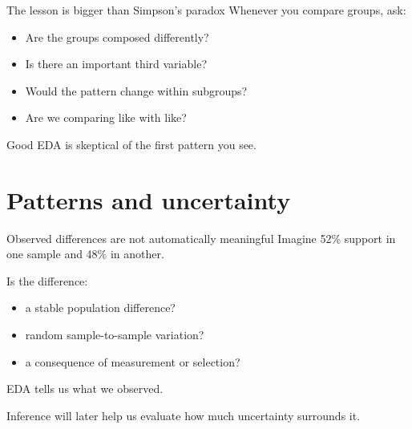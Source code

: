 \documentclass[11pt,aspectratio=169]{beamer}
\begin{document}
\begin{frame}{The lesson is bigger than Simpson's paradox}
Whenever you compare groups, ask:

\begin{itemize}
  \item Are the groups composed differently?
  \item Is there an important third variable?
  \item Would the pattern change within subgroups?
  \item Are we comparing like with like?
\end{itemize}

\vspace{0.8em}
\begin{center}
\Large \alert{Good EDA is skeptical of the first pattern you see.}
\end{center}
\end{frame}

\section{Patterns and uncertainty}

\begin{frame}{Observed differences are not automatically meaningful}
Imagine 52\% support in one sample and 48\% in another.

\vspace{0.6em}
Is the difference:
\begin{itemize}
  \item a stable population difference?
  \item random sample-to-sample variation?
  \item a consequence of measurement or selection?
\end{itemize}

\vspace{0.6em}
EDA tells us \alert{what we observed}.

Inference will later help us evaluate \alert{how much uncertainty surrounds it}.
\end{frame}
\end{document}

